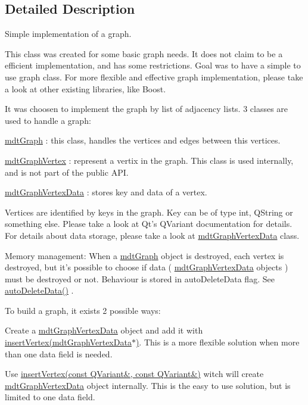 \subsection{Detailed Description}
Simple implementation of a graph. 

This class was created for some basic graph needs. It does not claim to be a efficient implementation, and has some restrictions. Goal was to have a simple to use graph class. For more flexible and effective graph implementation, please take a look at other existing libraries, like Boost.

It was choosen to implement the graph by list of adjacency lists. 3 classes are used to handle a graph:
\begin{DoxyItemize}
\item \hyperlink{classmdt_graph}{mdtGraph} : this class, handles the vertices and edges between this vertices.
\item \hyperlink{classmdt_graph_vertex}{mdtGraphVertex} : represent a vertix in the graph. This class is used internally, and is not part of the public API.
\item \hyperlink{classmdt_graph_vertex_data}{mdtGraphVertexData} : stores key and data of a vertex.
\end{DoxyItemize}

Vertices are identified by keys in the graph. Key can be of type int, QString or something else. Please take a look at Qt's QVariant documentation for details. For details about data storage, please take a look at \hyperlink{classmdt_graph_vertex_data}{mdtGraphVertexData} class.

Memory management: When a \hyperlink{classmdt_graph}{mdtGraph} object is destroyed, each vertex is destroyed, but it's possible to choose if data ( \hyperlink{classmdt_graph_vertex_data}{mdtGraphVertexData} objects ) must be destroyed or not. Behaviour is stored in autoDeleteData flag. See \hyperlink{classmdt_graph_aeddbd0dd4e6c090eafe9923ca1bc1b60}{autoDeleteData()} .

To build a graph, it exists 2 possible ways:
\begin{DoxyItemize}
\item Create a \hyperlink{classmdt_graph_vertex_data}{mdtGraphVertexData} object and add it with \hyperlink{classmdt_graph_a9f89cb73ae73446fe422cbd7e4dfebe8}{insertVertex(mdtGraphVertexData$\ast$)}. This is a more flexible solution when more than one data field is needed.
\item Use \hyperlink{classmdt_graph_ad4e3eb699e8bed5e638662b26c55f3f5}{insertVertex(const QVariant\&, const QVariant\&)} witch will create \hyperlink{classmdt_graph_vertex_data}{mdtGraphVertexData} object internally. This is the easy to use solution, but is limited to one data field. 
\end{DoxyItemize}

